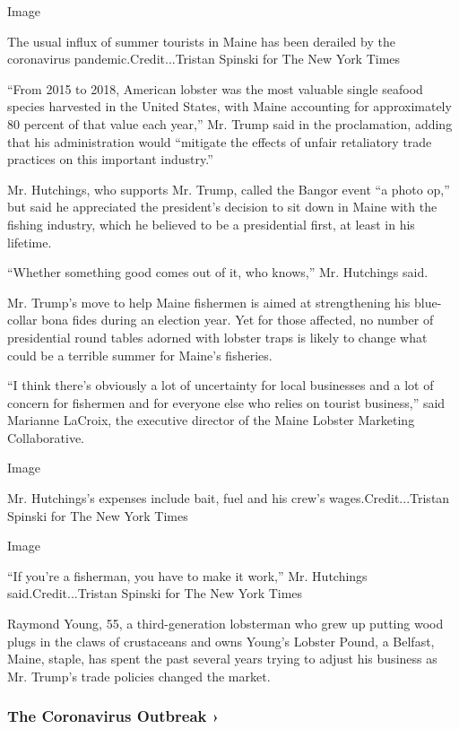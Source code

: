 Image

The usual influx of summer tourists in Maine has been derailed by the
coronavirus pandemic.Credit...Tristan Spinski for The New York Times

``From 2015 to 2018, American lobster was the most valuable single
seafood species harvested in the United States, with Maine accounting
for approximately 80 percent of that value each year,'' Mr. Trump said
in the proclamation, adding that his administration would ``mitigate the
effects of unfair retaliatory trade practices on this important
industry.''

Mr. Hutchings, who supports Mr. Trump, called the Bangor event ``a photo
op,'' but said he appreciated the president's decision to sit down in
Maine with the fishing industry, which he believed to be a presidential
first, at least in his lifetime.

``Whether something good comes out of it, who knows,'' Mr. Hutchings
said.

Mr. Trump's move to help Maine fishermen is aimed at strengthening his
blue-collar bona fides during an election year. Yet for those affected,
no number of presidential round tables adorned with lobster traps is
likely to change what could be a terrible summer for Maine's fisheries.

``I think there's obviously a lot of uncertainty for local businesses
and a lot of concern for fishermen and for everyone else who relies on
tourist business,'' said Marianne LaCroix, the executive director of the
Maine Lobster Marketing Collaborative.

Image

Mr. Hutchings's expenses include bait, fuel and his crew's
wages.Credit...Tristan Spinski for The New York Times

Image

``If you're a fisherman, you have to make it work,'' Mr. Hutchings
said.Credit...Tristan Spinski for The New York Times

Raymond Young, 55, a third-generation lobsterman who grew up putting
wood plugs in the claws of crustaceans and owns Young's Lobster Pound, a
Belfast, Maine, staple, has spent the past several years trying to
adjust his business as Mr. Trump's trade policies changed the market.

\href{https://www.nytimes.com/news-event/coronavirus?action=click\&pgtype=Article\&state=default\&region=MAIN_CONTENT_3\&context=storylines_faq}{}

\hypertarget{the-coronavirus-outbreak-}{%
\subsubsection{The Coronavirus Outbreak
›}\label{the-coronavirus-outbreak-}}

